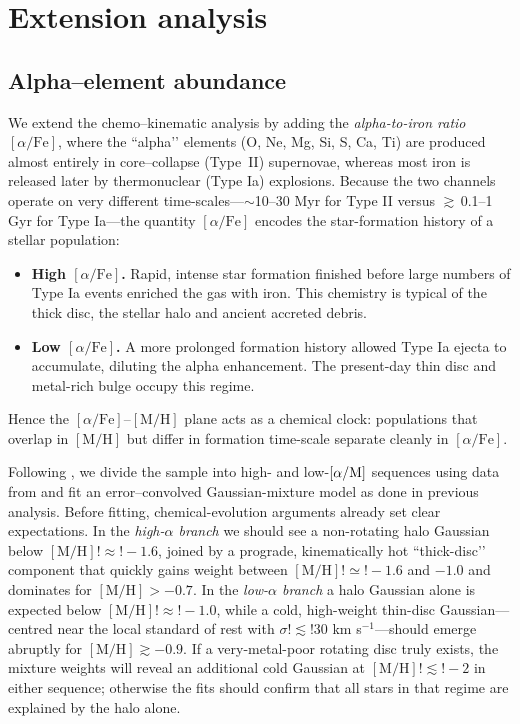 \documentclass[a4paper,12pt]{article}
\begin{document}
\section{Extension analysis}
\subsection{Alpha–element abundance}\label{subsec:alpha}

We extend the chemo–kinematic analysis by adding the
\emph{alpha-to-iron ratio} $[\alpha/\mathrm{Fe}]$, where the “alpha’’ elements
(O, Ne, Mg, Si, S, Ca, Ti) are produced almost entirely in core–collapse
(\hbox{Type II}) supernovae, whereas most iron is released later by
thermonuclear (Type Ia) explosions.  Because the two channels operate on
very different time-scales—$\sim$10–30 Myr for Type II versus
$\gtrsim$\,0.1–1 Gyr for Type Ia—the quantity $[\alpha/\mathrm{Fe}]$
encodes the star-formation history of a stellar population:

\begin{itemize}
  \item \textbf{High $[\alpha/\mathrm{Fe}]$.}  
        Rapid, intense star formation finished before large numbers of
        Type Ia events enriched the gas with iron.  This chemistry is
        typical of the thick disc, the stellar halo and ancient accreted
        debris.

  \item \textbf{Low $[\alpha/\mathrm{Fe}]$.}  
        A more prolonged formation history allowed Type Ia ejecta to
        accumulate, diluting the alpha enhancement.  The present-day thin
        disc and metal-rich bulge occupy this regime.
\end{itemize}

Hence the $[\alpha/\mathrm{Fe}]$–$[\mathrm{M/H}]$ plane acts as a chemical
clock: populations that overlap in $[\mathrm{M/H}]$ but differ in formation
time-scale separate cleanly in $[\alpha/\mathrm{Fe}]$.

Following \citet{Vis2024}, we divide the sample into high- and low-$[\alpha/{\rm M}]$ 
sequences using data from \citet{Li2024} and fit an error–convolved Gaussian-mixture model
as done in previous analysis. Before fitting, chemical-evolution 
arguments already set clear expectations. In the \textit{high-$\alpha$ branch} we should 
see a non-rotating halo Gaussian below $[\mathrm{M/H}]!\approx!-1.6$, joined by a 
prograde, kinematically hot “thick-disc’’ component that quickly gains weight between 
$[\mathrm{M/H}]!\simeq!-1.6$ and $-1.0$ and dominates for $[\mathrm{M/H}]>-0.7$. In 
the \textit{low-$\alpha$ branch} a halo Gaussian alone is expected below 
$[\mathrm{M/H}]!\approx!-1.0$, while a cold, high-weight thin-disc Gaussian—centred 
near the local standard of rest with $\sigma!\lesssim!30$ km s$^{-1}$—should emerge 
abruptly for $[\mathrm{M/H}]\gtrsim-0.9$. If a very-metal-poor rotating disc truly 
exists, the mixture weights will reveal an additional cold Gaussian at 
$[\mathrm{M/H}]!\lesssim!-2$ in either sequence; otherwise the fits should confirm that 
all stars in that regime are explained by the halo alone.
\end{document}
